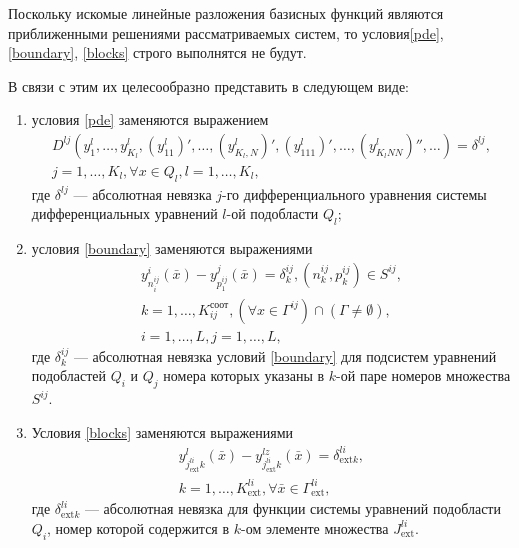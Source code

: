 \documentclass[a4paper,12pt]{article}
\begin{document}
Поскольку искомые линейные разложения базисных функций являются 
приближенными решениями рассматриваемых систем, то условия\eqref{pde},
\eqref{boundary}, \eqref{blocks} строго выполнятся не будут.

В связи с этим их целесообразно представить в следующем виде:
\begin{enumerate}[label=\alph*)]
    \item условия \eqref{pde} заменяются выражением
        \begin{equation}
            \begin{array}{cc}
                D^{lj}(y^l_1,\ldots,y^l_{K_l}, (y^l_{11})',\ldots,
                (y^l_{K_l,N})', (y^l_{111})',\ldots,
                (y^l_{K_lNN})'',\ldots) = \delta^{lj},\\
                j = 1,\ldots,K_l, \forall x \in Q_l, l=1,\ldots, K_l,
            \end{array}
            \label{pde_resid}
        \end{equation}
        где $\delta^{lj}$ --- абсолютная невязка $j$-го дифференциального
        уравнения системы дифференциальных уравнений $l$-ой подобласти
        $Q_l$;
    \item условия \eqref{boundary} заменяются выражениями
        \begin{equation}
            \begin{array}{cc}
                y^i_{n^{ij}_i}(\bar{x})-y^j_{p^{ij}_1}(\bar{x})=
                \delta^{ij}_k,(n^{ij}_k,p^{ij}_k) \in S^{ij},\\
                k=1,\ldots,K^{соот}_{ij},
                \left( \forall x \in \Gamma^{ij} \right) \cap 
                \left( \Gamma \neq \emptyset \right),\\
                i=1,\ldots,L,j=1,\ldots,L,
            \end{array}
            \label{boundary_resid}
        \end{equation}
        где $\delta^{ij}_k$ --- абсолютная невязка условий 
        \eqref{boundary} для подсистем уравнений подобластей $Q_i$ и 
        $Q_j$ номера которых указаны в $k$-ой паре номеров множества 
        $S^{ij}$.
    \item Условия \eqref{blocks} заменяются выражениями
        \begin{equation}
            \begin{array}{cc}
                y^l_{j^{li}_{\text{ext} }k}(\bar{x})-
                y^{lz}_{j^{li}_{\text{ext} }k}(\bar{x})=\delta^{li}_{\text{ext} k},\\
                k=1,\ldots,K^{li}_{\text{ext}},\forall \bar{x} \in 
                \Gamma^{li}_{\text{ext}},
            \end{array}
            \label{blocks_resid}
        \end{equation}
        где $\delta^{li}_{\text{ext} k}$ --- абсолютная невязка для
        функции системы уравнений подобласти $Q_i$, номер которой
        содержится в $k$-ом элементе множества $J^{li}_{\text{ext}}$.
\end{enumerate}
\end{document}
